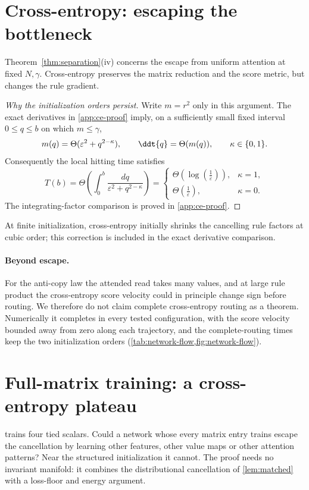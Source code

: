 \section{Cross-entropy: escaping the bottleneck}
\label{sec:crossentropy}
Theorem~\ref{thm:separation}(iv) concerns the escape from uniform attention at fixed $N,\gamma$.
Cross-entropy preserves the matrix reduction and the score metric, but changes the rule gradient.
\begin{proof}[Why the initialization orders persist]
Write $m=r^2$ only in this argument. The exact derivatives in \cref{app:ce-proof} imply,
on a sufficiently small fixed interval $0\le q\le b$ on which $m\le\gamma$,
\[
 m(q)=\Theta(\varepsilon^2+q^{2-\kappa}),\qquad
 \ddt{q}=\Theta(m(q)),\qquad \kappa\in\{0,1\}.
\]
Consequently the local hitting time satisfies
\[
 T(b)=\Theta\!\left(\int_0^b\frac{dq}{\varepsilon^2+q^{2-\kappa}}\right)
 =\begin{cases}
 \Theta(\log(\tfrac{1}{\varepsilon})),&\kappa=1,\\
 \Theta(\tfrac{1}{\varepsilon}),&\kappa=0.
 \end{cases}
\]
The integrating-factor comparison is proved in \cref{app:ce-proof}.
\end{proof}
At finite initialization, cross-entropy initially shrinks the cancelling rule factors at cubic order;
this correction is included in the exact derivative comparison.

\paragraph{Beyond escape.}
For the anti-copy law the attended read takes many values, and at large rule product the cross-entropy score velocity
could in principle change sign before routing. We therefore do not claim complete cross-entropy routing as a theorem.
Numerically it completes in every tested configuration, with the score velocity bounded away from zero along each trajectory,
and the complete-routing times keep the two initialization orders (\cref{tab:network-flow,fig:network-flow}).

\section{Full-matrix training: a cross-entropy plateau}
\label{sec:fullmatrix}
 trains four tied scalars. Could a network whose every matrix entry trains escape the cancellation by learning other features,
other value maps or other attention patterns? Near the structured initialization it cannot. The proof needs no invariant manifold:
it combines the distributional cancellation of \cref{lem:matched} with a loss-floor and energy argument.

